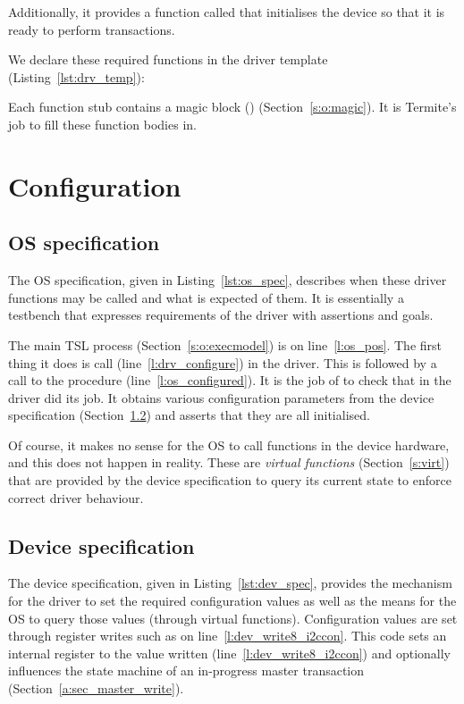 Additionally, it provides a function called  that initialises the device so that it is ready to perform transactions.

We declare these required functions in the driver template (Listing~\ref{lst:drv_temp}):
\vspace*{5mm}

\vspace*{5mm}

Each function stub contains a magic block () (Section~\ref{s:o:magic}). It is Termite's job to fill these function bodies in.

\section{Configuration}

\subsection{OS specification}

The OS specification, given in Listing~\ref{lst:os_spec}, describes when these driver functions may be called and what is expected of them. It is essentially a testbench that expresses requirements of the driver with assertions and goals.

The main TSL process (Section~\ref{s:o:execmodel}) is on line~\ref{l:os_pos}. The first thing it does is call  (line~\ref{l:drv_configure}) in the driver. This is followed by a call to the procedure  (line~\ref{l:os_configured}). It is the job of  to check that  in the driver did its job. It obtains various configuration parameters from the device specification (Section~\ref{a:sec:dev_spec}) and asserts that they are all initialised. 
        
Of course, it makes no sense for the OS to call functions in the device hardware, and this does not happen in reality. These are \emph{virtual functions} (Section~\ref{s:virt}) that are provided by the device specification to query its current state to enforce correct driver behaviour. 

\subsection{Device specification}
\label{a:sec:dev_spec}

The device specification, given in Listing~\ref{lst:dev_spec}, provides the mechanism for the driver to set the required configuration values as well as the means for the OS to query those values (through virtual functions). Configuration values are set through register writes such as  on line~\ref{l:dev_write8_i2ccon}. This code sets an internal register to the value written (line~\ref{l:dev_write8_i2ccon}) and optionally influences the state machine of an in-progress master transaction (Section~\ref{a:sec_master_write}). 


